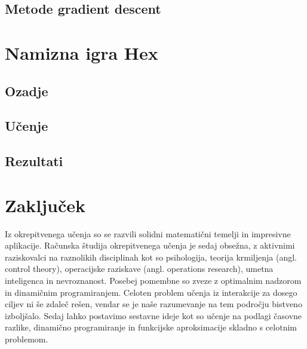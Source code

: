 \documentclass[a4paper, oneside, 12pt]{report}
\begin{document}
\section{Metode gradient descent}



\chapter{Namizna igra Hex}
\thispagestyle{fancy}
\section{Ozadje}
\section{Učenje}
\section{Rezultati}

\chapter{Zaključek}
\thispagestyle{fancy}
Iz okrepitvenega učenja so se razvili solidni matematični temelji in impresivne aplikacije. Računska študija okrepitvenega učenja je sedaj obsežna, z aktivnimi raziskovalci na raznolikih disciplinah kot so psihologija, teorija krmiljenja (angl. control theory), operacijske raziskave (angl. operations research), umetna inteligenca in nevroznanost. Posebej pomembne so zveze z optimalnim nadzorom in dinamičnim programiranjem. Celoten problem učenja iz interakcije za dosego ciljev ni še zdaleč rešen, vendar se je naše razumevanje na tem področju bistveno izboljšalo. Sedaj lahko postavimo sestavne ideje kot so učenje na podlagi časovne razlike, dinamično programiranje in funkcijske aproksimacije skladno s celotnim problemom.
\end{document}
